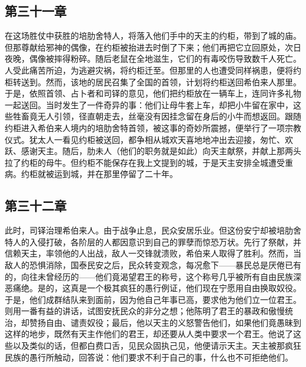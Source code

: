 
\subsection{第三十一章}

在这场胜仗中获胜的培肋舍特人，将落入他们手中的天主的约柜，带到了城的庙。但那尊献给邪神的偶像，在约柜被抬进去时倒了下来；他们再把它立回原处，次日夜晚，偶像被摔得粉碎。随后老鼠在全地滋生，它们的有毒咬伤导致数千人死亡。人受此痛苦所迫，为逃避灾祸，将约柜迁至。但那里的人也遭受同样祸患，便将约柜转送到。然而，该地的居民召集了全国的首领，计划将约柜送回希伯来人那里。于是，依照首领、占卜者和司铎的意见，他们把约柜放在一辆车上，连同许多礼物一起送回。当时发生了一件奇异的事：他们让母牛套上车，却把小牛留在家中，这些牲畜竟无人引领，径直朝走去，丝毫没有因挂念留在身后的小牛而想返回。跟随约柜进入希伯来人境内的培肋舍特首领，被这事的奇妙所震撼，便举行了一项宗教仪式。犹太人一看见约柜被送回，都争相从城欢天喜地地冲出去迎接，匆忙、欢跃、感谢天主。随后，肋未人（他们的职务就是如此）向天主献祭，并献上那两头拉了约柜的母牛。但约柜不能保存在我上文提到的城，于是天主安排全城遭受重病。约柜就被运到城，并在那里停留了二十年。\par


\subsection{第三十二章}

此时，司铎治理希伯来人。由于战争止息，民众安居乐业。但这份安宁却被培肋舍特人的入侵打破，各阶层的人都因意识到自己的罪孽而惊恐万状。先行了祭献，并信赖天主，率领他的人出战，敌人一交锋就溃败，希伯来人取得了胜利。然而，当敌人的恐惧消除，国泰民安之后，民众转变观念，每况愈下——暴民总是厌倦已有的，向往未曾经历的——他们竟渴望君王的称号，这个称号几乎被所有自由民族深恶痛绝。是的，这真是一个极其疯狂的愚行例证，他们现在宁愿用自由换取奴役。于是，他们成群结队来到面前，因为他自己年事已高，要求他为他们立一位君王。则用一番有益的讲话，试图安抚民众的非分之想；他陈明了君王的暴政和傲慢统治，却赞扬自由、谴责奴役；最后，他以天主的义怒警告他们，如果他们竟愚昧到这样的地步，既然有天主作他们的君王，却还要从人类中要求一个君王。他说了这些以及类似的话，但都白费口舌，见民众固执己见，他便请示天主。天主被那疯狂民族的愚行所触动，回答说：他们要求不利于自己的事，什么也不可拒绝他们。\par

